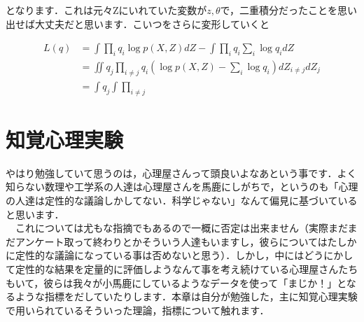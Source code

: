 \documentclass[11pt,a4paper,dvipdfmx]{ujreport}
\begin{document}
となります．これは元々Zにいれていた変数が$z,\theta$で，二重積分だったことを思い出せば大丈夫だと思います．こいつをさらに変形していくと

\begin{align}
  L(q) &= \int \prod_i q_i \log p(X,Z)dZ - \int \prod_i q_i\sum_i \log q_i dZ\\
  &=\iint q_j\prod_{i\neq j} q_i (\log p(X,Z) - \sum_i \log q_i) dZ_{i \neq j}dZ_j\\
  &=\int q_j \int \prod_{i\neq j}
\end{align}








































\chapter{知覚心理実験}
やはり勉強していて思うのは，心理屋さんって頭良いよなあという事です．よく知らない数理や工学系の人達は心理屋さんを馬鹿にしがちで，というのも「心理の人達は定性的な議論しかしてない．科学じゃない」なんて偏見に基づいていると思います．\\
　これについては尤もな指摘でもあるので一概に否定は出来ません（実際まだまだアンケート取って終わりとかそういう人達もいますし，彼らについてはたしかに定性的な議論になっている事は否めないと思う）．しかし，中にはどうにかして定性的な結果を定量的に評価しようなんて事を考え続けている心理屋さんたちもいて，彼らは我々が小馬鹿にしているようなデータを使って「まじか！」となるような指標をだしていたりします．本章は自分が勉強した，主に知覚心理実験で用いられているそういった理論，指標について触れます．
\end{document}
